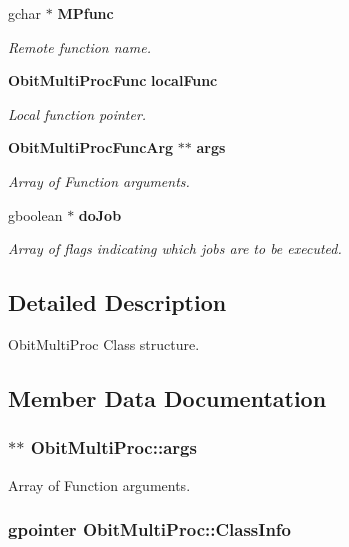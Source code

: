 \begin{CompactItemize}
gchar $\ast$ {\bf MPfunc}
\begin{CompactList}\small\item\em Remote function name. \item\end{CompactList}\item 
{\bf Obit\-Multi\-Proc\-Func} {\bf local\-Func}
\begin{CompactList}\small\item\em Local function pointer. \item\end{CompactList}\item 
{\bf Obit\-Multi\-Proc\-Func\-Arg} $\ast$$\ast$ {\bf args}
\begin{CompactList}\small\item\em Array of Function arguments. \item\end{CompactList}\item 
gboolean $\ast$ {\bf do\-Job}
\begin{CompactList}\small\item\em Array of flags indicating which jobs are to be executed. \item\end{CompactList}\end{CompactItemize}


\subsection{Detailed Description}
Obit\-Multi\-Proc Class structure. 



\subsection{Member Data Documentation}
\subsubsection{$\ast$$\ast$ {\bf Obit\-Multi\-Proc::args}}\label{structObitMultiProc_o8}


Array of Function arguments. 

\subsubsection{\setlength{\rightskip}{0pt plus 5cm}gpointer {\bf Obit\-Multi\-Proc::Class\-Info}}\label{structObitMultiProc_o1}


